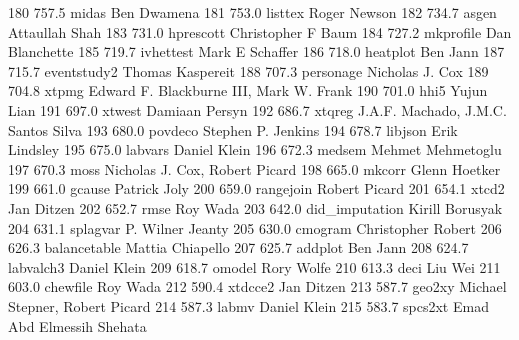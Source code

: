    180    757.5    midas         Ben Dwamena                             
   181    753.0    listtex       Roger Newson                            
   182    734.7    asgen         Attaullah Shah                          
   183    731.0    hprescott     Christopher F Baum                      
   184    727.2    mkprofile     Dan Blanchette                          
   185    719.7    ivhettest     Mark E Schaffer                         
   186    718.0    heatplot      Ben Jann                                
   187    715.7    eventstudy2   Thomas Kaspereit                        
   188    707.3    personage     Nicholas J. Cox                         
   189    704.8    xtpmg         Edward F. Blackburne III, Mark W. Frank 
   190    701.0    hhi5          Yujun Lian                              
   191    697.0    xtwest        Damiaan Persyn                          
   192    686.7    xtqreg        J.A.F. Machado, J.M.C. Santos Silva     
   193    680.0    povdeco       Stephen P. Jenkins                      
   194    678.7    libjson       Erik Lindsley                           
   195    675.0    labvars       Daniel Klein                            
   196    672.3    medsem        Mehmet Mehmetoglu                       
   197    670.3    moss          Nicholas J. Cox, Robert Picard          
   198    665.0    mkcorr        Glenn Hoetker                           
   199    661.0    gcause        Patrick Joly                            
   200    659.0    rangejoin     Robert Picard                           
   201    654.1    xtcd2         Jan Ditzen                              
   202    652.7    rmse          Roy Wada                                
   203    642.0    did_imputation  Kirill Borusyak                         
   204    631.1    splagvar      P. Wilner Jeanty                        
   205    630.0    cmogram       Christopher Robert                      
   206    626.3    balancetable  Mattia Chiapello                        
   207    625.7    addplot       Ben Jann                                
   208    624.7    labvalch3     Daniel Klein                            
   209    618.7    omodel        Rory Wolfe                              
   210    613.3    deci          Liu Wei                                 
   211    603.0    chewfile      Roy Wada                                
   212    590.4    xtdcce2       Jan Ditzen                              
   213    587.7    geo2xy        Michael Stepner, Robert Picard          
   214    587.3    labmv         Daniel Klein                            
   215    583.7    spcs2xt       Emad Abd Elmessih Shehata               
